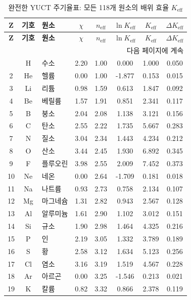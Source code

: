 \documentclass[12pt,a4paper]{article}
\newcommand{\Keff}{K_{\mathrm{eff}}}
\begin{document}
	\begin{longtable}{|c|c|p{2.5cm}|c|c|c|c|c|}
		\caption{완전한 YUCT 주기율표: 모든 118개 원소의 배위 효율 $\Keff$}
		\label{tab:complete-periodic} \\
		\hline
		\textbf{Z} & \textbf{기호} & \textbf{원소} & $\chi$ & $n_{\text{eff}}$ & $\ln \Keff$ & $\Keff$ & $\Delta \Keff$ \\
		\hline
		\endfirsthead
		\hline
		\textbf{Z} & \textbf{기호} & \textbf{원소} & $\chi$ & $n_{\text{eff}}$ & $\ln \Keff$ & $\Keff$ & $\Delta \Keff$ \\
		\hline
		\endhead
		\hline \multicolumn{8}{|r|}{{다음 페이지에 계속}} \\ \hline
		\endfoot
		\hline
		\endlastfoot
		1 & H & 수소 & 2.20 & 1.00 & 0.000 & 1.000 & 0.050 \\
		2 & He & 헬륨 & 0.00 & 1.00 & -1.877 & 0.153 & 0.015 \\
		3 & Li & 리튬 & 0.98 & 1.59 & 0.613 & 1.847 & 0.092 \\
		4 & Be & 베릴륨 & 1.57 & 1.91 & 0.851 & 2.341 & 0.117 \\
		5 & B & 붕소 & 2.04 & 2.08 & 1.138 & 3.121 & 0.156 \\
		6 & C & 탄소 & 2.55 & 2.22 & 1.735 & 5.667 & 0.283 \\
		7 & N & 질소 & 3.04 & 2.34 & 1.443 & 4.234 & 0.212 \\
		8 & O & 산소 & 3.44 & 2.45 & 1.930 & 6.892 & 0.345 \\
		9 & F & 플루오린 & 3.98 & 2.55 & 2.009 & 7.452 & 0.373 \\
		10 & Ne & 네온 & 0.00 & 2.64 & -1.709 & 0.181 & 0.018 \\
		11 & Na & 나트륨 & 0.93 & 2.73 & 0.758 & 2.134 & 0.107 \\
		12 & Mg & 마그네슘 & 1.31 & 2.82 & 0.943 & 2.567 & 0.128 \\
		13 & Al & 알루미늄 & 1.61 & 2.90 & 1.102 & 3.012 & 0.151 \\
		14 & Si & 규소 & 1.90 & 2.98 & 1.464 & 4.325 & 0.216 \\
		15 & P & 인 & 2.19 & 3.05 & 1.332 & 3.789 & 0.189 \\
		16 & S & 황 & 2.58 & 3.12 & 1.634 & 5.123 & 0.256 \\
		17 & Cl & 염소 & 3.16 & 3.19 & 1.519 & 4.567 & 0.228 \\
		18 & Ar & 아르곤 & 0.00 & 3.25 & -1.546 & 0.213 & 0.021 \\
		19 & K & 칼륨 & 0.82 & 3.32 & 0.866 & 2.378 & 0.119 \\

\end{longtable}
\end{document}
